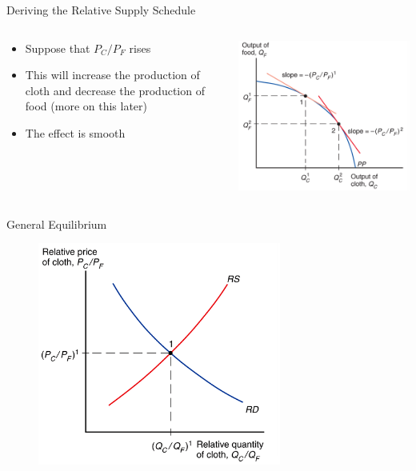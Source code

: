 \documentclass[10pt,hyperref={CJKbookmarks=true},xcolor=dvipsnames,aspectratio=169]{beamer}
\begin{document}
\begin{frame}{Deriving the Relative Supply Schedule}


\begin{columns}[onlytextwidth]
\begin{column}{0.4\textwidth}
\begin{itemize}
\item Suppose that $P_{C}/P_{F}$ rises 
\item This will increase the production of cloth and decrease the production
of food (more on this later) 
\item The effect is smooth
\end{itemize}

\end{column}
\begin{column}{0.6\textwidth}
\centering \includegraphics[width=0.7\columnwidth]{fig/sfm/lec4-15}
\end{column}
\end{columns}

\end{frame}

\begin{frame}{General Equilibrium }


\begin{figure}


\centering{}\includegraphics[width=8cm]{fig/sfm/lec4-16}
\end{figure}

\end{frame}
\end{document}

